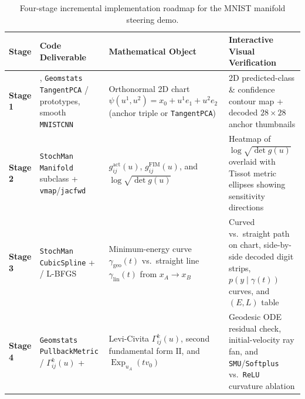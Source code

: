 \documentclass[11pt,a4paper]{article}
\DeclareMathOperator{\Exp}{Exp}
\theoremstyle{definition}
\begin{document}
\begin{table}[ht!]
\centering
\small
\renewcommand{\arraystretch}{1.35}
\begin{tabularx}{\textwidth}{@{} l >{\raggedright\arraybackslash}p{} Y >{\raggedright\arraybackslash}p{0.26\textwidth} @{}}
\toprule
\textbf{Stage} & \textbf{Code Deliverable} & \textbf{Mathematical Object} & \textbf{Interactive Visual Verification} \\
\midrule
\textbf{Stage 1} & , \texttt{Geomstats} \texttt{TangentPCA} / prototypes, smooth \texttt{MNISTCNN} & Orthonormal 2D chart $\psi(u^1, u^2) = x_0 + u^1 e_1 + u^2 e_2$ (anchor triple or \texttt{TangentPCA}) & 2D predicted-class \& confidence contour map + decoded $28\times 28$ anchor thumbnails \\
\addlinespace
\textbf{Stage 2} & \texttt{StochMan} \texttt{Manifold} subclass + \texttt{vmap}/\texttt{jacfwd} & $g^{\mathrm{act}}_{ij}(u)$, $g^{\mathrm{FIM}}_{ij}(u)$, and  $\log\sqrt{\det g(u)}$ & Heatmap of $\log\sqrt{\det g(u)}$ overlaid with Tissot metric ellipses showing sensitivity directions \\
\addlinespace
\textbf{Stage 3} & \texttt{StochMan} \texttt{CubicSpline} +  / L-BFGS & Minimum-energy curve $\gamma_{\mathrm{geo}}(t)$ vs.\ straight line $\gamma_{\mathrm{lin}}(t)$ from $x_A \to x_B$ & Curved vs.\ straight path on chart, side-by-side decoded digit strips, $p(y\mid \gamma(t))$ curves, and $(E, L)$ table \\
\addlinespace
\textbf{Stage 4} & \texttt{Geomstats} \texttt{PullbackMetric} / $\Gamma^k_{ij}(u)$ +  & Levi-Civita $\Gamma^k_{ij}(u)$, second fundamental form $\mathrm{II}$, and $\Exp_{u_A}(t v_0)$ & Geodesic ODE residual check, initial-velocity ray fan, and \texttt{SMU}/\texttt{Softplus} vs.\ \texttt{ReLU} curvature ablation \\
\bottomrule
\end{tabularx}
\caption{Four-stage incremental implementation roadmap for the MNIST manifold steering demo.}
\label{tab:stages}
\end{table}
\end{document}

